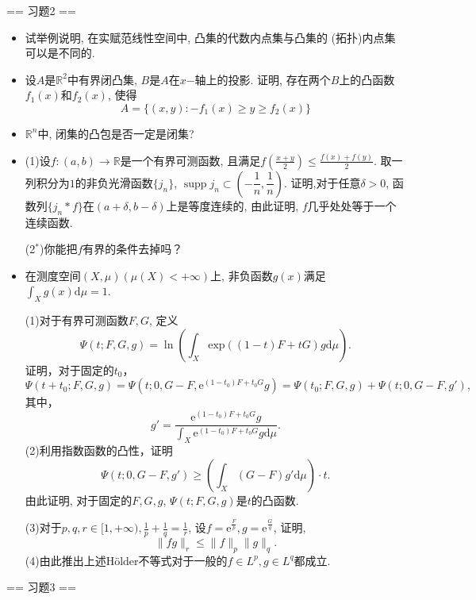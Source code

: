 == 习题2 ==
\begin{itemize}
    \item[1]试举例说明, 在实赋范线性空间中, 凸集的代数内点集与凸集的
    (拓扑)内点集可以是不同的.
    \item[2]设$A$是$\mathbb{R}^2$中有界闭凸集, $B$是$A$在$x$−轴上的投影. 
    证明, 存在两个$B$上的凸函数$f_1(x)$和$f_2(x)$, 使得
	$$A=\{(x,y): -f_1(x)\geqslant y \geqslant f_2(x)\}$$
    \item[3]$\mathbb{R}^n$中, 闭集的凸包是否一定是闭集?
    \item[4] (1)设$f:(a,b)\rightarrow\mathbb{R}$是一个有界可测函数, 
    且满足$\displaystyle f\left(\frac{x+y}{2}\right)\leqslant\frac{f(x)+f(y)}{2}$. 
    取一列积分为$1$的非负光滑函数$\{j_n\}$, 
    $\operatorname{supp}j_n \subset \left(-\dfrac{1}{n}, \dfrac{1}{n}\right)$. 
    证明,对于任意$\delta > 0$, 函数列$\{j_n*f\}$在$(a +\delta, b −\delta)$上是等度连续的, 
    由此证明, $f$几乎处处等于一个连续函数.\par
    (2$^*$)你能把$f$有界的条件去掉吗？
    \item[5]在测度空间$(X,\mu)(\mu (X)<+\infty)$上, 非负函数$g(x)$满足
    $\displaystyle \int_{X}g(x)\mathrm{d}\mu=1$.\par
    	(1)对于有界可测函数$F,G$, 定义
	$$\Psi(t;F,G,g)=\ln\left(\int_{X}\text{exp}((1-t)F+tG)g\mathrm{d}\mu\right).$$
    证明，对于固定的$t_0$，
	$$\Psi(t+t_0;F,G,g)=\Psi(t;0,G-F,\mathrm{e}^{(1-t_0)F+t_0G}g)
    =\Psi(t_0;F,G,g)+\Psi(t;0,G-F,g'),$$
    其中，
	$$g'=\frac{\mathrm{e}^{(1-t_0)F+t_0G}g}{\int_{X}\mathrm{e}^{(1-t_0)F+t_0G}g\mathrm{d}\mu}.$$
    	(2)利用指数函数的凸性，证明
	$$\Psi(t;0,G-F,g')\geqslant \left(\int_{X}(G-F)g'\mathrm{d}\mu\right)·t.$$
    由此证明, 对于固定的$F,G,g$, $\Psi (t;F,G,g)$是$t$的凸函数.\par
	    (3)对于$p,q,r\in [1,+\infty), \displaystyle \frac{1}{p}+\frac{1}{q}=\frac{1}{r}$, 
        设$ f=\mathrm{e}^{\frac{F}{p}}, g=\mathrm{e}^{\frac{G}{q}}$, 证明,
	$$\|fg\|_r \leqslant \|f\|_p \|g\|_q.$$
	    (4)由此推出上述Hölder不等式对于一般的$f \in L^p, g\in L^q$都成立.
\end{itemize}

== 习题3 ==

